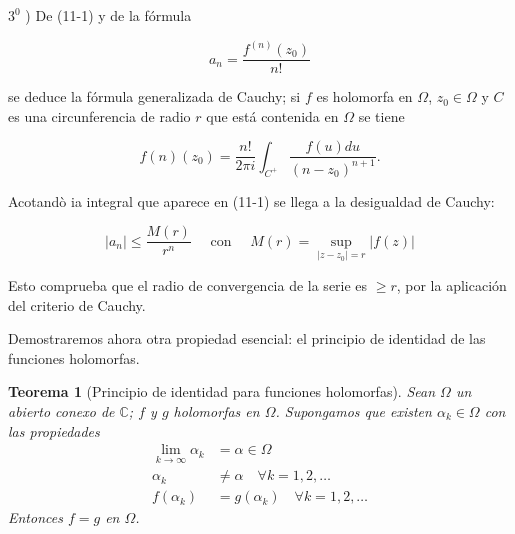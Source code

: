 \documentclass[10pt]{article}
\theoremstyle{plain}
\newtheorem{theorem}{Teorema}[section]
\theoremstyle{definition}
\theoremstyle{remark}
\begin{document}
$3^{0}$ ) De (11-1) y de la fórmula

$$
a_{n}=\frac{f^{(n)}\left(z_{0}\right)}{n!}
$$

se deduce la fórmula generalizada de Cauchy; si $f$ es holomorfa en $\Omega$, $z_{0} \in \Omega$ y $C$ es una circunferencia de radio $r$ que está contenida en $\Omega$ se tiene


\begin{equation*}
f(n)\left(z_{0}\right)=\frac{n!}{2 \pi i} \int_{C^{+}} \frac{f(u) d u}{\left(n-z_{0}\right)^{n+1}} . \tag{11-2}
\end{equation*}


Acotandò ia integral que aparece en (11-1) se llega a la desigualdad de Cauchy:


\begin{equation*}
\left|a_{n}\right| \leqslant \frac{M(r)}{r^{n}} \quad \text { con } \quad M(r)=\sup _{\left|z-z_{0}\right|=r}|f(z)| \tag{11-3}
\end{equation*}


Esto comprueba que el radio de convergencia de la serie es $\geqslant r$, por la aplicación del criterio de Cauchy.

Demostraremos ahora otra propiedad esencial: el principio de identidad de las funciones holomorfas.

\begin{theorem}[Principio de identidad para funciones holomorfas]
Sean $\Omega$ un abierto conexo de $\mathbb{C}$; $f$ y $g$ holomorfas en $\Omega$. Supongamos que existen $\alpha_{k} \in \Omega$ con las propiedades
$$\begin{aligned}
\lim_{k \rightarrow \infty} \alpha_{k} &= \alpha \in \Omega \\
\alpha_{k} &\neq \alpha \quad \forall k=1,2, \ldots \\
f(\alpha_{k}) &= g(\alpha_{k}) \quad \forall k=1,2, \ldots
\end{aligned}$$
Entonces $f=g$ en $\Omega$.
\end{theorem}
\end{document}
